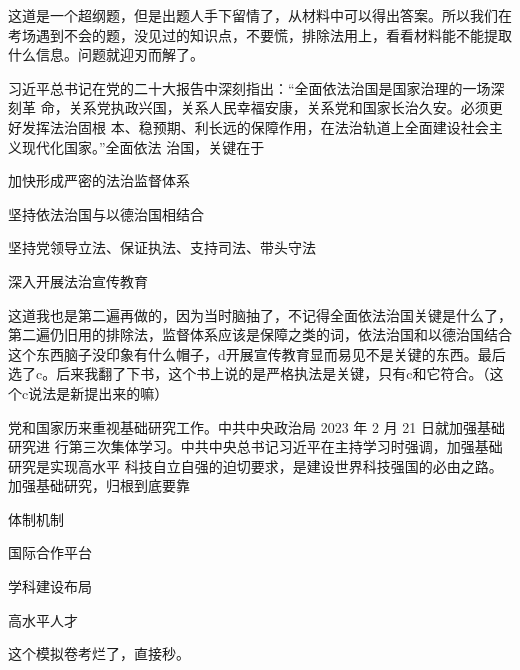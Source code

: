 \documentclass[lang=cn,newtx,10pt,scheme=chinese,pad,twocol]{zznote}
\begin{document}
\begin{postulate}
	这道是一个超纲题，但是出题人手下留情了，从材料中可以得出答案。所以我们在考场遇到不会的题，没见过的知识点，不要慌，排除法用上，看看材料能不能提取什么信息。问题就迎刃而解了。
\end{postulate}
\begin{exercise}习近平总书记在党的二十大报告中深刻指出：“全面依法治国是国家治理的一场深刻革 命，关系党执政兴国，关系人民幸福安康，关系党和国家长治久安。必须更好发挥法治固根 本、稳预期、利长远的保障作用，在法治轨道上全面建设社会主义现代化国家。”全面依法 治国，关键在于
	\begin{choice}
		\item 加快形成严密的法治监督体系
		\item 坚持依法治国与以德治国相结合
		\item 坚持党领导立法、保证执法、支持司法、带头守法
		\item 深入开展法治宣传教育
	\end{choice}
\end{exercise}
\begin{solution}
	这道我也是第二遍再做的，因为当时脑抽了，不记得全面依法治国关键是什么了，第二遍仍旧用的排除法，监督体系应该是保障之类的词，依法治国和以德治国结合这个东西脑子没印象有什么帽子，d开展宣传教育显而易见不是关键的东西。最后选了c。后来我翻了下书，这个书上说的是严格执法是关键，只有c和它符合。（这个c说法是新提出来的嘛）
\end{solution}


\begin{exercise}党和国家历来重视基础研究工作。中共中央政治局 2023 年 2 月 21 日就加强基础研究进 行第三次集体学习。中共中央总书记习近平在主持学习时强调，加强基础研究是实现高水平 科技自立自强的迫切要求，是建设世界科技强国的必由之路。加强基础研究，归根到底要靠
	\begin{choice}
		\item 体制机制
		\item 国际合作平台
		\item 学科建设布局
		\item 高水平人才
	\end{choice}
\end{exercise}
\begin{solution}
	这个模拟卷考烂了，直接秒。
\end{solution}
\end{document}

